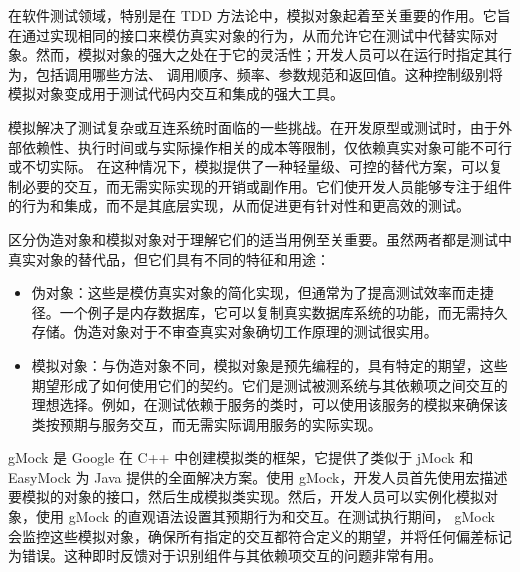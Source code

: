 在软件测试领域，特别是在 TDD 方法论中，模拟对象起着至关重要的作用。它旨在通过实现相同的接口来模仿真实对象的行为，从而允许它在测试中代替实际对象。然而，模拟对象的强大之处在于它的灵活性；开发人员可以在运行时指定其行为，包括调用哪些方法、 调用顺序、频率、参数规范和返回值。这种控制级别将模拟对象变成用于测试代码内交互和集成的强大工具。

模拟解决了测试复杂或互连系统时面临的一些挑战。在开发原型或测试时，由于外部依赖性、执行时间或与实际操作相关的成本等限制，仅依赖真实对象可能不可行或不切实际。
在这种情况下，模拟提供了一种轻量级、可控的替代方案，可以复制必要的交互，而无需实际实现的开销或副作用。它们使开发人员能够专注于组件的行为和集成，而不是其底层实现，从而促进更有针对性和更高效的测试。

区分伪造对象和模拟对象对于理解它们的适当用例至关重要。虽然两者都是测试中真实对象的替代品，但它们具有不同的特征和用途：

\begin{itemize}
\item
伪对象：这些是模仿真实对象的简化实现，但通常为了提高测试效率而走捷径。一个例子是内存数据库，它可以复制真实数据库系统的功能，而无需持久存储。伪造对象对于不审查真实对象确切工作原理的测试很实用。

\item
模拟对象：与伪造对象不同，模拟对象是预先编程的，具有特定的期望，这些期望形成了如何使用它们的契约。它们是测试被测系统与其依赖项之间交互的理想选择。例如，在测试依赖于服务的类时，可以使用该服务的模拟来确保该类按预期与服务交互，而无需实际调用服务的实际实现。
\end{itemize}

gMock 是 Google 在 C++ 中创建模拟类的框架，它提供了类似于 jMock 和 EasyMock 为 Java 提供的全面解决方案。使用 gMock，开发人员首先使用宏描述要模拟的对象的接口，然后生成模拟类实现。然后，开发人员可以实例化模拟对象，使用 gMock 的直观语法设置其预期行为和交互。在测试执行期间， gMock 会监控这些模拟对象，确保所有指定的交互都符合定义的期望，并将任何偏差标记为错误。这种即时反馈对于识别组件与其依赖项交互的问题非常有用。












